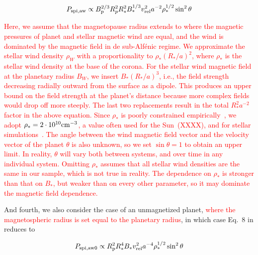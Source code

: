\documentclass[twocolumn]{aastex631}
\begin{document}
\begin{equation}
    P_{\rm spi,aw} \propto B_{\rm p}^{2/3} R_{p}^2  R_*^2  B_*^{1/3}  v_{\rm rel}^2 a^{-2} \rho_*^{1/2} \sin^2 \theta
\end{equation}

\textcolor{red}{Here, we assume that the magnetopause radius extends to where the magnetic pressures of planet and stellar magnetic wind are equal, and the wind is dominated by the magnetic field in de sub-Alf\'enic regime. We approximate the stellar wind density $\rho_W$ with a proportionality to $\rho_* (R_* / a)^{2}$, where $\rho_*$ is the stellar wind density at the base of the corona. For the stellar wind magnetic field at the planetary radius $B_W$, we insert $B_* (R_* / a)^{3}$, i.e., the field strength decreasing radially outward from the surface as a dipole. This produces an upper bound on the field strength at the planet's distance because more complex fields would drop off more steeply. The last two replacements result in the total $R_*^2 a^{-2}$ factor in the above equation. Since $\rho_*$ is poorly constrained empirically~\citep{vidotto2021evolution}, we adopt $\rho_*=2\cdot10^{10}\rm{cm}^{-3}$, a value often used for the Sun~(XXXX), and for stellar simulations~\citep{alvarado-gomez2020tuning,kavanagh2021planetinduced}. The angle between the wind magnetic field vector and the velocity vector of the planet $\theta$ is also unknown, so we set $\sin\theta=1$ to obtain an upper limit. In reality, $\theta$ will vary both between systems, and over time in any individual system. Omitting $\rho_*$ assumes that all stellar wind densities are the same in our sample, which is not true in reality. The dependence on $\rho_*$ is stronger than that on $B_*$, but weaker than on every other parameter, so it may dominate the magnetic field dependence.}

And fourth, we also consider the case of an unmagnetized planet, \textcolor{red}{ where the magnetospheric radius is set equal to the planetary radius}, in which case Eq.~8 in \cite{kavanagh2022radio} reduces to

\begin{equation}
    P_{\rm spi,aw0} \propto R_{\rm p}^2 R_*^4 B_*  v_{\rm rel}^2 a^{-4} \rho_*^{1/2} \sin^2 \theta
\end{equation}

\end{document}
